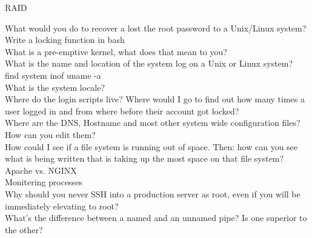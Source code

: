 \documentclass{notes}
\begin{document}
	\begin{questions}{RAID}
		\begin{questionAnswer}
		\end{questionAnswer}
	\end{questions}

What would you do to recover a lost the root password to a Unix/Linux system?\\
Write a locking function in bash\\
What is a pre-emptive kernel, what does that mean to you?\\
What is the name and location of the system log on a Unix or Linux system?\\
find system inof \ra uname -a\\
What is the system locale?\\
Where do the login scripts live? Where would I go to find out how many times a user logged in and from where before their account got locked?\\
Where are the DNS, Hostname and most other system wide configuration files? How can you edit them?\\
How could I see if a file system is running out of space. Then: how can you see what is being written that is taking up the most space on that file system?\\
Apache vs. NGINX\\
Monitering processes\\
Why should you never SSH into a production server as root, even if you will be immediately elevating to root?\\
What's the difference between a named and an unnamed pipe? Is one superior to the other?\\



\end{document}
